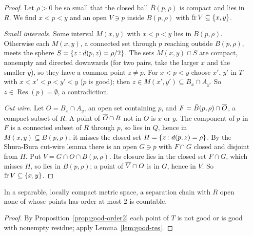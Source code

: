 \begin{proof}
Let $\rho>0$ be so small that the closed ball $\bar B(p,\rho)$ is compact and lies in $R$. We find $x<p<y$ and an open $V\ni p$ inside $B(p,\rho)$ with
$\operatorname{fr} V\subseteq\left\{ x,y \right\}$.

\emph{Small intervals.} Some interval $M(x,y)$ with $x<p<y$ lies in $B(p,\rho)$. Otherwise each $M(x,y)$, a connected set through $p$ reaching outside $B(p,\rho)$,
meets the sphere $S=\left\{ z:d(p,z)=\rho/2 \right\}$. The sets $M(x,y)\cap S$ are compact, nonempty and directed downwards (for two pairs, take the larger $x$ and the
smaller $y$), so they have a common point $z\ne p$. For $x<p<y$ choose $x'$, $y'$ in $T$ with $x<x'<p<y'<y$ ($p$ is good); then $z\in M(x',y')\subseteq B_x\cap A_y$.
So $z\in\operatorname{Res}(p)=\emptyset$, a contradiction.

\emph{Cut wire.} Let $O=B_x\cap A_y$, an open set containing $p$, and $F=\bar B(p,\rho)\cap\overline{O}$, a compact subset of $R$. A point of $\overline{O}\cap R$ not in $O$
is $x$ or $y$. The component of $p$ in $F$ is a connected subset of $R$ through $p$, so lies in $Q$, hence in $M(x,y)\subseteq B(p,\rho)$; it misses the
closed set $H=\left\{ z:d(p,z)=\rho \right\}$. By the Shura-Bura cut-wire lemma there is an open $G\ni p$ with $F\cap G$ closed and disjoint from $H$. Put $V=G\cap
O\cap B(p,\rho)$. Its closure lies in the closed set $F\cap G$, which misses $H$, so lies in $B(p,\rho)$; a point of $\overline{V}\cap O$ is in $G$, hence in $V$.
So $\operatorname{fr} V\subseteq\left\{ x,y \right\}$.
\end{proof}


\begin{corollary}\label{cor:chain-countable}
In a separable, locally compact metric space, a separation chain with $R$ open none of whose points has order at most $2$ is countable.
\end{corollary}

\begin{proof}
By Proposition~\ref{prop:good-order2} each point of $T$ is not good or is good with nonempty residue; apply Lemma~\ref{lem:good-res}.
\end{proof}


